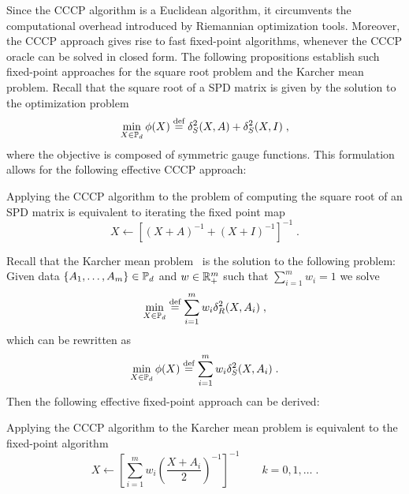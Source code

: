 \documentclass[sn-nature]{sn-jnl}%
\theoremstyle{thmstyleone}%
\theoremstyle{thmstyletwo}%
\theoremstyle{thmstylethree}%
\begin{document}
Since the CCCP algorithm is a Euclidean algorithm, it circumvents the computational overhead introduced by Riemannian optimization tools. Moreover, the CCCP approach gives rise to fast fixed-point algorithms, whenever the CCCP oracle can be solved in closed form.
The following propositions establish such fixed-point approaches for the square root problem and the Karcher mean problem. Recall that the square root of a SPD matrix is given by the solution to the optimization problem
\begin{equation}\label{problem:sdiv_sqrt}
    \min _{X \in \mathbb{P}_d} \phi(X) \stackrel{\text{def}}{=} \delta_S^2(X, A)+\delta_S^2(X, I) \; ,
\end{equation}
where the objective is composed of symmetric gauge functions. This formulation allows for the following effective CCCP approach:
\begin{prop}\label{prop:fp_sqrt}
    Applying the CCCP algorithm  to the problem of computing the square root of an SPD matrix is equivalent to iterating the fixed point map \begin{equation}\label{eq:sqrt_fp}
    X \leftarrow \left[(X + A)^{-1} + (X + I)^{-1}\right]^{-1} \; .    
    \end{equation}
\end{prop}
Recall that the Karcher mean problem~\cite{Karcher1977RiemannianCO,Jeuris2012ASA} is the solution to the following problem:
Given data $\{A_1, \ldots, A_m\} \in \mathbb{P}_d$ and $w \in \mathbb{R}^m_+$ such that $\sum_{i=1}^m w_i = 1$ we solve
\[
\min_{X \in \mathbb{P}_d} \stackrel{\text{def}}{=} \sum_{i=1}^m w_i \delta_R^2(X,A_i) \; ,
\]
which can be rewritten as~\cite{sra2013sdivergence}
\begin{equation}\label{problem:sdiv_karcher_mean}
\min_{X \in \mathbb{P}_d} \phi(X) \stackrel{\text{def}}{=} \sum_{i=1}^m w_i \delta_S^2(X, A_i)    \; .
\end{equation}
Then the following effective fixed-point approach can be derived:
\begin{prop}\label{prop:fp_karcher}
  Applying the CCCP algorithm  to the Karcher mean problem is equivalent to the fixed-point algorithm 
    \begin{equation}\label{eq:karcher_fp}
        X \leftarrow \left[  \sum_{i=1}^m w_i \left( \frac{X+A_i}{2}\right)^{-1} \right]^{-1} \qquad k = 0 , 1, \ldots \; .
    \end{equation}
\end{prop}
\end{document}
